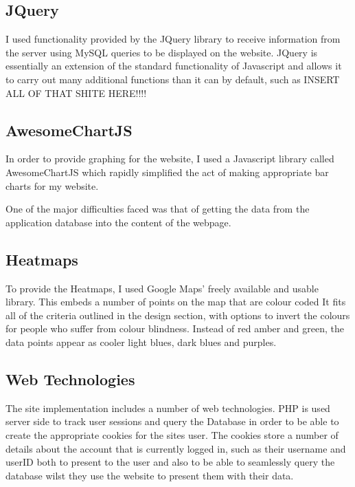 \documentclass{l4proj}
\begin{document}
\subsection{JQuery}

I used functionality provided by the JQuery library to receive information from the server using MySQL queries to be displayed on the website. JQuery is essentially an extension of the standard functionality of Javascript and allows it to carry out many additional functions than it can by default, such as INSERT ALL OF THAT SHITE HERE!!!!

\subsection{AwesomeChartJS}

In order to provide graphing for the website, I used a Javascript library called AwesomeChartJS which rapidly simplified the act of making appropriate bar charts for my website.

One of the major difficulties faced was that of getting the data from the application database into the content of the webpage.

\subsection{Heatmaps}

To provide the Heatmaps, I used Google Maps' freely  available and usable library. This embeds a number of points on the map that are colour coded  It fits all of the criteria outlined in the design section, with options to invert the colours for people who suffer from colour blindness. Instead of red amber and green, the data points appear as cooler light blues, dark blues and purples.

\subsection{Web Technologies}

The site implementation includes a number of web technologies. PHP is used server side to track user sessions and query the Database in order to be able to create the appropriate cookies for the sites user. The cookies store a number of details about the account that is currently logged in, such as their username and userID both to present to the user and also to be able to seamlessly query the database wilst they use the website to present them with their data.
\end{document}
